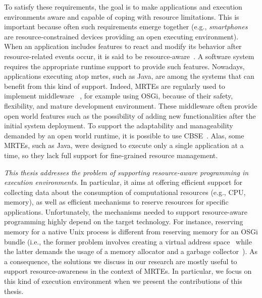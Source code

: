 To satisfy these requirements, the goal is to make applications and execution environments aware and capable of coping with resource limitations.
This is important because often such requirements emerge together
(e.g., \textit{smartphones} are resource-constrained devices providing an open executing environment).
When an application includes features to react and modify its behavior after resource-related events occur, it is said to be resource-aware~\cite{Boldrini:2008:CRA:1549824.1550106,Peddemors:2007:NRA:1256316.1256338,Alhaisoni:2010:RTO:1664767.1664770,Polo:2011:RAS:2414338.2414352,Bulej:2012:PAC:2408860.2410068,autili2012hybrid}.
A software system requires the appropriate runtime support to provide such features.
Nowadays, applications executing atop \glspl{mrte}, such as Java, are among the systems that can benefit from this kind of support.
Indeed, MRTEs are regularly used to implement middleware ~\cite{Bruneton:2006:FCM:1152333.1152345,Fouquet:2014:DED:2602576.2611461,OracleEJB3.0,Becker:2010:PCM:1712605.1712651,Carlson2006127}, for example using OSGi, because of their safety, flexibility, and mature development environment.
These middleware often provide open world features such as the possibility of adding new functionalities after the initial system deployment.
To support the adaptability and manageability demanded by an open world runtime, it is possible to use \gls{CBSE}~\cite{gruntz2002component,Duclos:2002:DUN:508386.508394, Bruneton:2006:FCM:1152333.1152345}.
Alas, some MRTEs, such as Java, were designed to execute only a single application at a time, so they lack full support for fine-grained resource management.

  
\textit{This thesis addresses the problem of supporting resource-aware programming in execution environments}.
In particular, it aims at offering efficient support for collecting data about the consumption of computational resources (e.g., CPU, memory), as well as efficient mechanisms to reserve resources for specific applications.
Unfortunately, the mechanisms needed to support resource-aware programming highly depend on the target technology.
For instance, reserving memory for a native Unix process is different from reserving memory for an OSGi bundle (i.e., the former problem involves creating a virtual address space~\cite{Stallings2014} while the latter demands the usage of a memory allocator and a garbage collector~\cite{OSGiAlliance2014,alpern2000jalapeno,Richard2012,Geoffray:2010:VSM:1837854.1736006}).
As a consequence, the solutions we discuss in our research are mostly useful to support resource-awareness in the context of MRTEs.
In particular, we focus on this kind of execution environment when we present the contributions of this thesis.


